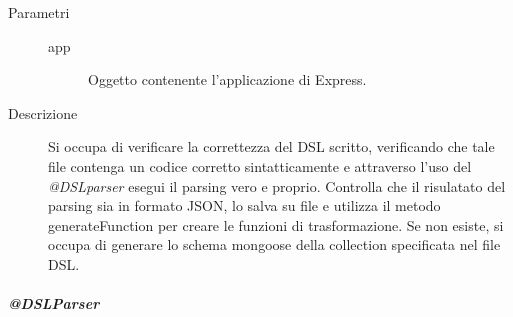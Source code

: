 \begin{description}
\begin{mldescription}
 	\begin{description}
    		\item[Parametri] \hfill
    			\begin{description}
    				\item[app]
    				Oggetto contenente l'applicazione di Express.
    			\end{description}
    		\item[Descrizione]
    		Si occupa di verificare la correttezza del DSL scritto, verificando che tale file contenga un codice corretto sintatticamente e attraverso l'uso del \textit{@DSLparser} esegui il parsing vero e proprio. Controlla che il risulatato del parsing sia in formato JSON, lo salva su file e utilizza il metodo generateFunction per creare le funzioni di trasformazione. Se non esiste, si occupa di generare lo schema mongoose della collection specificata nel file DSL.
    \end{description}
 \end{mldescription}
 
\end{description}
\subparagraph{@DSLParser}
